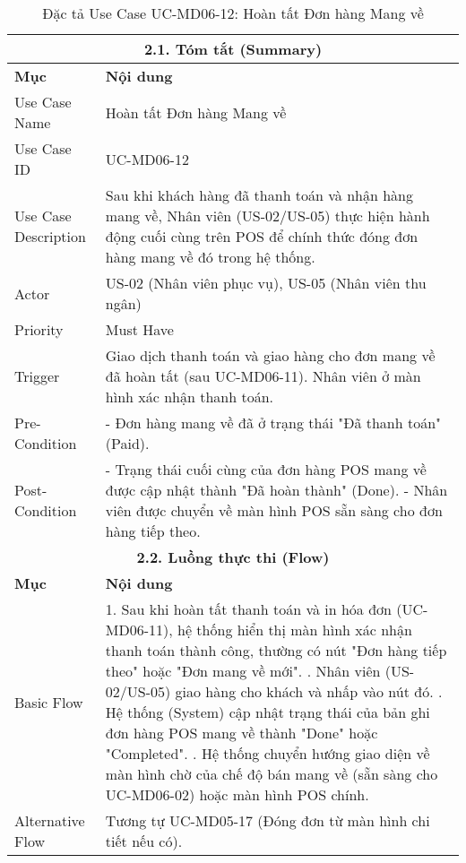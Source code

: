 \begin{longtable}{|m{4cm}|p{11cm}|}
\caption{Đặc tả Use Case UC-MD06-12: Hoàn tất Đơn hàng Mang về} \label{tab:uc_md06_12_final_v3} \\
\hline
\multicolumn{2}{|c|}{\textbf{2.1. Tóm tắt (Summary)}} \\
\hline
\textbf{Mục} & \textbf{Nội dung} \\
\hline
\endhead %
\hline
\endfoot %
\hline
\endlastfoot %
Use Case Name & Hoàn tất Đơn hàng Mang về \\
\hline
Use Case ID & UC-MD06-12 \\
\hline
Use Case Description & Sau khi khách hàng đã thanh toán và nhận hàng mang về, Nhân viên (US-02/US-05) thực hiện hành động cuối cùng trên POS để chính thức đóng đơn hàng mang về đó trong hệ thống. \\
\hline
Actor & US-02 (Nhân viên phục vụ), US-05 (Nhân viên thu ngân) \\
\hline
Priority & Must Have \\
\hline
Trigger & Giao dịch thanh toán và giao hàng cho đơn mang về đã hoàn tất (sau UC-MD06-11). Nhân viên ở màn hình xác nhận thanh toán. \\
\hline
Pre-Condition & - Đơn hàng mang về đã ở trạng thái "Đã thanh toán" (Paid). \\
\hline
Post-Condition & - Trạng thái cuối cùng của đơn hàng POS mang về được cập nhật thành "Đã hoàn thành" (Done). \newline - Nhân viên được chuyển về màn hình POS sẵn sàng cho đơn hàng tiếp theo. \\
\hline
\multicolumn{2}{|c|}{\textbf{2.2. Luồng thực thi (Flow)}} \\
\hline
\textbf{Mục} & \textbf{Nội dung} \\
\hline
Basic Flow & 1. Sau khi hoàn tất thanh toán và in hóa đơn (UC-MD06-11), hệ thống hiển thị màn hình xác nhận thanh toán thành công, thường có nút "Đơn hàng tiếp theo" hoặc "Đơn mang về mới". \newline 2. Nhân viên (US-02/US-05) giao hàng cho khách và nhấp vào nút đó. \newline 3. Hệ thống (System) cập nhật trạng thái của bản ghi đơn hàng POS mang về thành "Done" hoặc "Completed". \newline 4. Hệ thống chuyển hướng giao diện về màn hình chờ của chế độ bán mang về (sẵn sàng cho UC-MD06-02) hoặc màn hình POS chính. \\
\hline
Alternative Flow & Tương tự UC-MD05-17 (Đóng đơn từ màn hình chi tiết nếu có). \\

\end{longtable}
